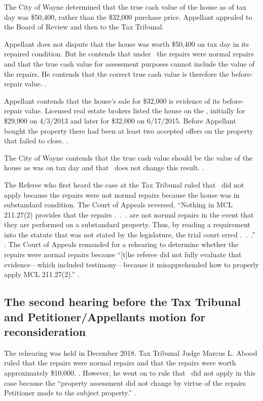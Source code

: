 \documentclass[12pt,\documentclassflag]{michiganCourtOfAppealsBrief}
\begin{document}
The City of Wayne determined that the true cash value of the house as of tax day was \$50,400, rather than the \$32,000 purchase price. Appellant appealed to the Board of Review and then to the Tax Tribunal.

Appellant does not dispute that the house was worth \$50,400 on tax day in its repaired condition. But he contends that under \mathieuGast\ the repairs were normal repairs and that the true cash value for assessment purposes cannot include the value of the repairs. He contends that the correct true cash value is therefore the before-repair value. \explanatoryLetter[].

Appellant contends that the house's sale for \$32,000 is evidence of its before-repair value. Licensed real estate brokers listed the house on the \MLS, initially for \$29,900 on 4/3/2013 and later for \$32,000 on 6/17/2015. Before Appellant bought the property there had been at least two accepted offers on the property that failed to close. \mlsHistory[]. 

The City of Wayne contends that the true cash value should be the value of the house as was on tax day and that \mathieuGast\ does not change this result. \foj[4].

The Referee who first heard the case at the Tax Tribunal ruled that \mathieuGast\ did not apply because the repairs were not normal repairs because the house was in substandard condition. The Court of Appeals reversed. ``Nothing in MCL 211.27(2) provides that the repairs .~.~. are not normal repairs in the event that they are performed on a substandard property. Thus, by reading a requirement into the statute that was not stated by the legislature, the trial court erred .~.~.'' . The Court of Appeals remanded for a rehearing to determine whether the repairs were normal repairs because ``[t]he referee did not fully evaluate that evidence---which included testimony---because it misapprehended how to properly apply MCL 211.27(2).'' .

\subsection{The second hearing before the Tax Tribunal and Petitioner/Appellants motion for reconsideration}

The rehearing was held in December 2018. Tax Tribunal Judge Marcus L. Abood ruled that the repairs were normal repairs and that the repairs were worth approximately \$10,000. \foj[4]. However, he went on to rule that \mathieuGast\ did not apply in this case because the ``property assessment did not change by virtue of the repairs Petitioner made to the subject property.'' \foj[5].
\end{document}

